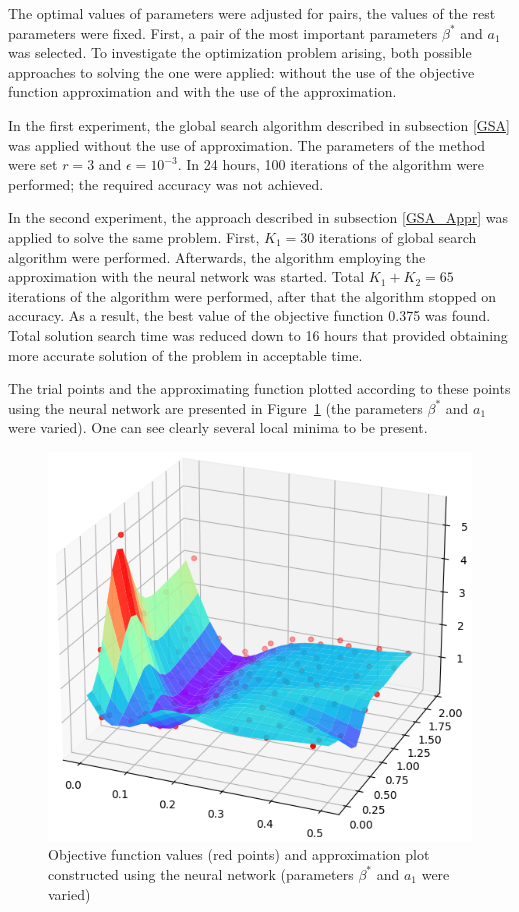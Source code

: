 \documentclass[applsci,article,submit,moreauthors,pdftex]{Definitions/mdpi}
\begin{document}
The optimal values of parameters were adjusted for pairs, the values of the rest parameters were fixed. 
First, a pair of the most important parameters $\beta^*$ and $a_1$ was selected. 
To investigate the optimization problem arising, both possible approaches to solving the one were applied: without the use of the objective function approximation  and with the use of the approximation.

In the first experiment, the global search algorithm described in subsection \ref{GSA} was applied without the use of approximation. 
The parameters of the method were set $r = 3$ and $\epsilon = 10^{-3}$. 
In 24 hours, 100 iterations of the algorithm were performed; the required accuracy was not achieved. 

In the second experiment, the approach described in subsection \ref{GSA_Appr} was applied to solve the same problem.
First, $K_1 = 30$ iterations of global search algorithm were performed. 
Afterwards, the algorithm employing the approximation with the neural network was started. 
Total $K_1 + K_2 = 65$ iterations of the algorithm were performed, after that the algorithm stopped on accuracy. 
As a result, the best value  of the objective function 0.375 was found. 
Total solution search time was reduced down to 16 hours that provided obtaining more accurate solution of the problem in acceptable time.

The trial points and the approximating function plotted according to these points using the neural network are presented in Figure~\ref{NN_100_point} (the parameters $\beta^*$ and $a_1$ were varied). One can see clearly several local minima to be present.

\begin{figure}[H]
\begin{center}
\includegraphics[width=0.8\linewidth]{NN_100_point_.png}
\caption{Objective function values (red points) and approximation plot constructed using the neural network (parameters $\beta^*$ and $a_1$ were varied)}
\label{NN_100_point}
\end{center}
\end{figure}
\end{document}
